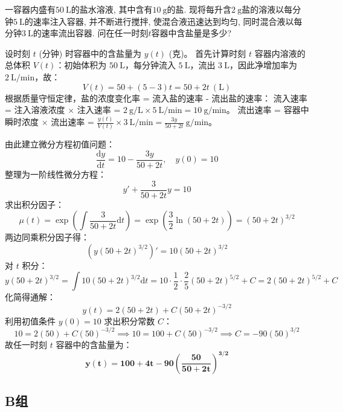 \documentclass[lang=cn,11pt]{elegantbook}
\begin{document}
\begin{exercise}[溶液混合问题]
    一容器内盛有$50\ \mathrm{L}$的盐水溶液, 其中含有$10\ \mathrm{g}$的盐. 现将每升含$2\ \mathrm{g}$盐的溶液以每分钟$5\ \mathrm{L}$的速率注入容器, 并不断进行搅拌, 使混合液迅速达到均匀, 同时混合液以每分钟$3\ \mathrm{L}$的速率流出容器. 问在任一时刻$t$容器中含盐量是多少?
\end{exercise}
\begin{solution}
设时刻 $t$ (分钟) 时容器中的含盐量为 $y(t)$ (克)。
首先计算时刻 $t$ 容器内溶液的总体积 $V(t)$：初始体积为 $50\ \mathrm{L}$，每分钟流入 $5\ \mathrm{L}$，流出 $3\ \mathrm{L}$，因此净增加率为 $2\ \mathrm{L}/\text{min}$，故：
\[
V(t) = 50 + (5-3)t = 50 + 2t \ (\mathrm{L})
\]
根据质量守恒定律，盐的浓度变化率 = 流入盐的速率 - 流出盐的速率：
流入速率 = 注入溶液浓度 $\times$ 注入速率 = $2\ \mathrm{g/L} \times 5\ \mathrm{L/min} = 10\ \mathrm{g/min}$。
流出速率 = 容器中瞬时浓度 $\times$ 流出速率 = $\frac{y(t)}{V(t)} \times 3\ \mathrm{L/min} = \frac{3y}{50+2t}\ \mathrm{g/min}$。

由此建立微分方程初值问题：
\[
\frac{\mathrm{d}y}{\mathrm{d}t} = 10 - \frac{3y}{50+2t}, \quad y(0) = 10
\]
整理为一阶线性微分方程：
\[
y' + \frac{3}{50+2t}y = 10
\]
求出积分因子：
\[
\mu(t) = \exp\!\left(\int \frac{3}{50+2t}\mathrm{d}t\right) = \exp\!\left(\frac{3}{2}\ln(50+2t)\right) = (50+2t)^{3/2}
\]
两边同乘积分因子得：
\[
\left(y(50+2t)^{3/2}\right)' = 10(50+2t)^{3/2}
\]
对 $t$ 积分：
\[
y(50+2t)^{3/2} = \int 10(50+2t)^{3/2}\mathrm{d}t = 10 \cdot \frac{1}{2} \cdot \frac{2}{5}(50+2t)^{5/2} + C = 2(50+2t)^{5/2} + C
\]
化简得通解：
\[
y(t) = 2(50+2t) + C(50+2t)^{-3/2}
\]
利用初值条件 $y(0) = 10$ 求出积分常数 $C$：
\[
10 = 2(50) + C(50)^{-3/2} \implies 10 = 100 + C(50)^{-3/2} \implies C = -90(50)^{3/2}
\]
故任一时刻 $t$ 容器中的含盐量为：
\[
\mathbf{y(t) = 100 + 4t - 90\left(\frac{50}{50+2t}\right)^{\!3/2}}
\]
\end{solution}

\subsection{B组}
\end{document}
